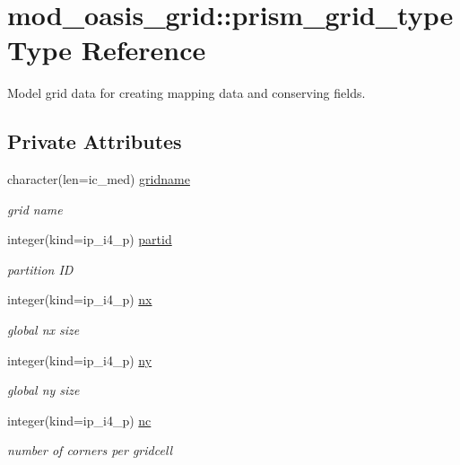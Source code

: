 \hypertarget{structmod__oasis__grid_1_1prism__grid__type}{}\section{mod\+\_\+oasis\+\_\+grid\+:\+:prism\+\_\+grid\+\_\+type Type Reference}
\label{structmod__oasis__grid_1_1prism__grid__type}


Model grid data for creating mapping data and conserving fields.  


\subsection*{Private Attributes}
\begin{DoxyCompactItemize}
\item 
character(len=ic\+\_\+med) \hyperlink{structmod__oasis__grid_1_1prism__grid__type_a51bf2e1319c04ec74a7787da72a0535b}{gridname}
\begin{DoxyCompactList}\small\item\em grid name \end{DoxyCompactList}\item 
integer(kind=ip\+\_\+i4\+\_\+p) \hyperlink{structmod__oasis__grid_1_1prism__grid__type_a8638cf8b735e72872be089682d0f8340}{partid}
\begin{DoxyCompactList}\small\item\em partition ID \end{DoxyCompactList}\item 
integer(kind=ip\+\_\+i4\+\_\+p) \hyperlink{structmod__oasis__grid_1_1prism__grid__type_ad27a1fc4d01d2b69f95d7cf9bcdbe571}{nx}
\begin{DoxyCompactList}\small\item\em global nx size \end{DoxyCompactList}\item 
integer(kind=ip\+\_\+i4\+\_\+p) \hyperlink{structmod__oasis__grid_1_1prism__grid__type_ad12673fd6c928ed6441e5584c16d0a3e}{ny}
\begin{DoxyCompactList}\small\item\em global ny size \end{DoxyCompactList}\item 
integer(kind=ip\+\_\+i4\+\_\+p) \hyperlink{structmod__oasis__grid_1_1prism__grid__type_a9a562f1211ac03c0b308f156a9c88e39}{nc}
\begin{DoxyCompactList}\small\item\em number of corners per gridcell \end{DoxyCompactList}\item 

\end{DoxyCompactItemize}
